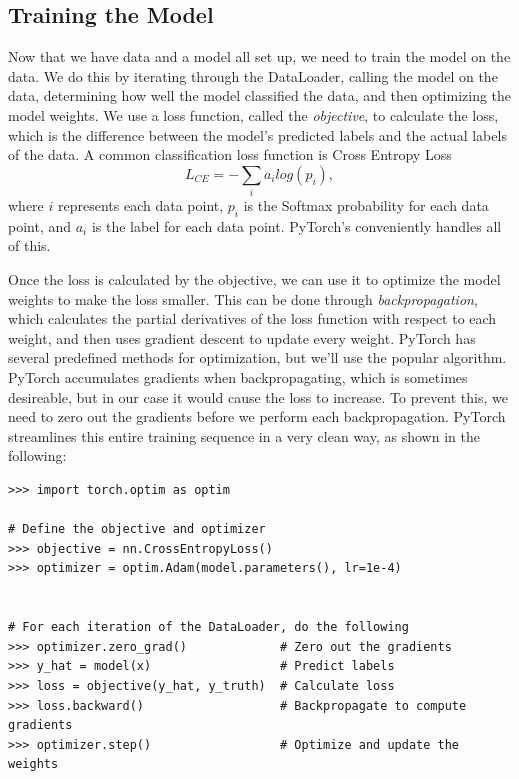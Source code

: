\subsection*{Training the Model}
Now that we have data and a model all set up, we need to train the model on the data.
We do this by iterating through the DataLoader, calling the model on the data, determining how well the model classified the data, and then optimizing the model weights.
We use a loss function, called the \emph{objective}, to calculate the loss, which is the difference between the model's predicted labels and the actual labels of the data.
A common classification loss function is Cross Entropy Loss
\begin{equation*}
    L_{CE} = -\sum_i a_i log(p_i),
    \label{eq:cel}
\end{equation*}
where $i$ represents each data point, $p_i$ is the Softmax probability for each data point, and $a_i$ is the label for each data point.
PyTorch's  conveniently handles all of this.

Once the loss is calculated by the objective, we can use it to optimize the model weights to make the loss smaller.
This can be done through \emph{backpropagation}, which calculates the partial derivatives of the loss function with respect to each weight, and then uses gradient descent to update every weight.
PyTorch has several predefined methods for optimization, but we'll use the popular  algorithm.
PyTorch accumulates gradients when backpropagating, which is sometimes desireable, but in our case it would cause the loss to increase.
To prevent this, we need to zero out the gradients before we perform each backpropagation. 
PyTorch streamlines this entire training sequence in a very clean way, as shown in the following:

\begin{lstlisting}
>>> import torch.optim as optim

# Define the objective and optimizer
>>> objective = nn.CrossEntropyLoss()
>>> optimizer = optim.Adam(model.parameters(), lr=1e-4)


# For each iteration of the DataLoader, do the following
>>> optimizer.zero_grad()             # Zero out the gradients
>>> y_hat = model(x)                  # Predict labels
>>> loss = objective(y_hat, y_truth)  # Calculate loss
>>> loss.backward()                   # Backpropagate to compute gradients
>>> optimizer.step()                  # Optimize and update the weights
\end{lstlisting}

